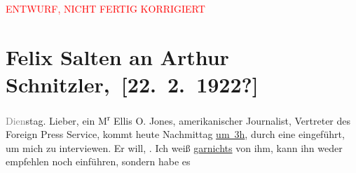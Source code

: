 
\begin{center}
            \textcolor{red}{ENTWURF, NICHT FERTIG KORRIGIERT}
                      \end{center}
            
         
         \renewcommand{\erwaehntePersonen}{Personen: Paul Claudel, Ellis O. Jones, Felix Salten}
         \renewcommand{\erwaehnteInstitutionen}{Institutionen: Foreign Press Service}
         \renewcommand{\erwaehnteOrte}{Orte: Berlin, Vereinigte Staaten von Amerika (USA), Wien}
         \renewcommand{\erwaehnteWerke}{Werke: Der Tausch. Drama in drei Akten}
               \section[ Felix Salten an Arthur Schnitzler, {[}22. 2. 1922?{]}]{ Felix Salten an Arthur Schnitzler, {[}22. 2. 1922?{]}}\nopagebreak{}\rehead{ }\begin{ledgroupsized}[t]{13cm}\normalsize\beginnumbering \toendnotes[C]{\smallbreak\pagebreak[2]} 
\toendnotes[C]{\smallbreak}\pstart
           \raggedleft{}{\pb}\textcolor{gray}{Dien}stag.\pend
           \pstart{}Lieber,\pend\pstart
           ein M\textsuperscript{r}{ }Ellis O. Jones, amerikanischer Journalist, Vertreter des Foreign Press Service, kommt heute{ }Nachmittag \uline{um 3h}, durch eine \label{K_L03595-1v}\label{K_L03595-1h} eingeführt, um mich zu interviewen. Er
               will, \label{K_L03595-2v}\label{K_L03595-2h}. Ich weiß \uline{garnichts} von ihm, kann ihn weder empfehlen noch einführen, sondern habe es

\end{ledgroupsized}
